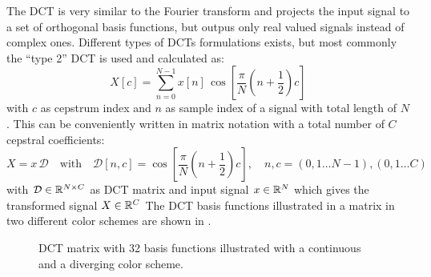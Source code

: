 The DCT is very similar to the Fourier transform and projects the input signal to a set of orthogonal basis functions, but outpus only real valued signals instead of complex ones.
Different types of DCTs formulations exists, but most commonly the \enquote{type 2} DCT is used and calculated as:
\begin{equation}\label{eq:signal_mfcc_dct}
  X[c] = \sum_{n=0}^{N-1} x[n] \, \cos{\left[ \frac{\pi}{N} \left( n + \frac{1}{2} \right) c \right]}
\end{equation}
with $c$ as cepstrum index and $n$ as sample index of a signal with total length of $N$.
This can be conveniently written in matrix notation with a total number of $C$ cepstral coefficients:
\begin{equation}\label{eq:signal_mfcc_dct_matrix}
  X =  x \, \mathcal{D} \quad \mathrm{with} \quad \mathcal{D}[n, c] = \cos{\left[ \frac{\pi}{N} \left( n + \frac{1}{2} \right) c  \right]}, 
  \quad n, c = (0, 1 \dots N - 1), (0, 1 \dots C) 
\end{equation}
with $\mathcal{D} \in \mathbb{R}^{N \times C}$ as DCT matrix and input signal $x \in \mathbb{R}^N$ which gives the transformed signal $X \in \mathbb{R}^C$
The DCT basis functions illustrated in a matrix in two different color schemes are shown in .
\begin{figure}[!ht]
  \centering
  \quad
  \caption{DCT matrix with 32 basis functions illustrated with a continuous and a diverging color scheme.}
  \label{fig:signal_mfcc_dct}
\end{figure}
